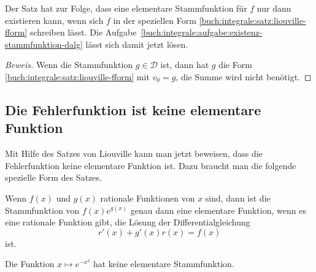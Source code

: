 Der Satz hat zur Folge, dass eine elementare Stammfunktion für $f$ 
nur dann existieren kann, wenn sich $f$ in der speziellen Form
\eqref{buch:integrale:satz:liouville-fform}
schreiben lässt.
Die Aufgabe~\ref{buch:integrale:aufgabe:existenz-stammfunktion-dalg}
lässt sich damit jetzt lösen.


\begin{proof}[Beweis]
Wenn die Stammfunktion $g\in\mathscr{D}$ ist, dann hat $g$ die Form
\eqref{buch:integrale:satz:liouville-fform} mit $v_0=g$, die Summe
wird nicht benötigt.

\end{proof}

\subsection{Die Fehlerfunktion ist keine elementare Funktion
\label{buch:integrale:section:fehlernichtelementar}}
Mit Hilfe des Satzes von Liouville kann man jetzt beweisen, dass 
die Fehlerfunktion keine elementare Funktion ist.
Dazu braucht man die folgende spezielle Form des Satzes.

\begin{satz}
\label{buch:integrale:satz:elementarestammfunktion}
Wenn $f(x)$ und $g(x)$ rationale Funktionen von $x$ sind, dann
ist die Stammfunktion von $f(x)e^{g(x)}$ genau dann eine 
elementare Funktion, wenn es eine rationale Funktion gibt, die
Lösung der Differentialgleichung
\[
r'(x) + g'(x)r(x)=f(x)
\]
ist.
\end{satz}

\begin{satz}
Die Funktion $x\mapsto e^{-x^2}$ hat keine elementare Stammfunktion.
\label{buch:iintegrale:satz:expx2}
\end{satz}

